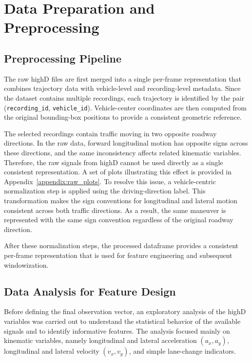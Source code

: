 \section{Data Preparation and Preprocessing}
\label{sec:data_preparation}






\subsection{Preprocessing Pipeline}
\label{subsec:preprocessing_pipeline}
The raw highD files are first merged into a single per-frame representation that combines trajectory data with vehicle-level and recording-level metadata. 
Since the dataset contains multiple recordings, each trajectory is identified by the pair (\texttt{recording\_id}, \texttt{vehicle\_id}).
Vehicle-center coordinates are then computed from the original bounding-box positions to provide a consistent geometric reference. 


\par The selected recordings contain traffic moving in two opposite roadway directions. 
In the raw data, forward longitudinal motion has opposite signs across these directions, and the same inconsistency affects related kinematic variables.  
Therefore, the raw signals from highD cannot be used directly as a single consistent representation. 
A set of plots illustrating this effect is provided in Appendix~\ref{appendix:raw_plots}. 
To resolve this issue, a vehicle-centric normalization step is applied using the driving-direction label. 
This transformation makes the sign conventions for longitudinal and lateral motion consistent across both traffic directions. 
As a result, the same maneuver is represented with the same sign convention regardless of the original roadway direction.


\par After these normalization steps, the processed dataframe provides a consistent per-frame representation that is used for feature engineering and subsequent windowization.


\subsection{Data Analysis for Feature Design}
\label{subsec:data_analysis_feature_design}
Before defining the final observation vector, an exploratory analysis of the highD variables was carried out to understand the statistical behavior of the available signals 
and to identify informative features. The analysis focused mainly on kinematic variables, namely longitudinal and lateral acceleration 
$(a_x, a_y)$, longitudinal and lateral velocity $(v_x, v_y)$, and simple lane-change indicators. 


